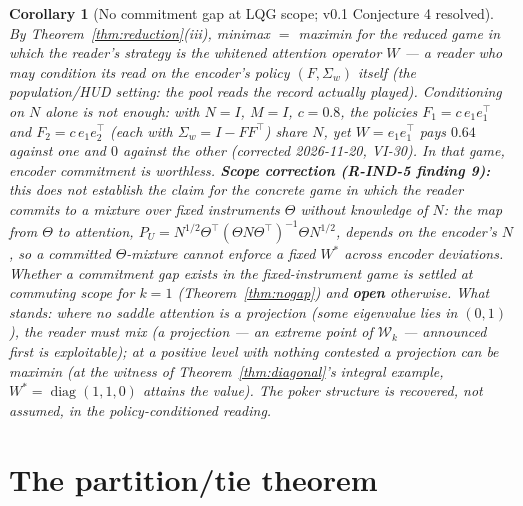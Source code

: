 \documentclass[11pt]{article}
\newtheorem{corollary}{Corollary}
\theoremstyle{definition}
\begin{document}
\begin{corollary}[No commitment gap at LQG scope; v0.1 Conjecture 4
resolved]\label{cor:commit}
By Theorem~\ref{thm:reduction}(iii), minimax $=$ maximin \emph{for
the reduced game in which the reader's strategy is the whitened
attention operator $W$} --- a reader who may condition its read on
the encoder's policy $(F,\Sigma_w)$ itself (the population/HUD
setting: the pool reads the record actually played). Conditioning on
$N$ alone is not enough: with $N=I$, $M=I$, $c=0.8$, the policies
$F_1=c\,e_1e_1^\top$ and $F_2=c\,e_1e_2^\top$ (each with
$\Sigma_w=I-FF^\top$) share $N$, yet $W=e_1e_1^\top$ pays $0.64$
against one and $0$ against the other (corrected 2026-11-20, VI-30).
In that game, encoder commitment is worthless. \textbf{Scope correction
(R-IND-5 finding 9):} this does \emph{not} establish the claim for
the concrete game in which the reader commits to a mixture over
fixed instruments $\Theta$ \emph{without} knowledge of $N$: the map
from $\Theta$ to attention, $P_U = N^{1/2}\Theta^\top(\Theta
N\Theta^\top)^{-1}\Theta N^{1/2}$, depends on the encoder's $N$, so
a committed $\Theta$-mixture cannot enforce a fixed $W^\ast$ across
encoder deviations. Whether a commitment gap exists in the
fixed-instrument game is settled at commuting scope for $k=1$
(Theorem~\ref{thm:nogap}) and \textbf{open} otherwise. What stands:
where no saddle attention is a projection (some eigenvalue lies in $(0,1)$), the reader must mix
(a projection --- an extreme point of $\mathcal W_k$ --- announced
first is exploitable); at a positive level with nothing contested a projection can be
maximin (at the witness of Theorem~\ref{thm:diagonal}'s integral
example, $W^\ast=\operatorname{diag}(1,1,0)$ attains the value). The
poker structure is recovered, not assumed, in the policy-conditioned
reading.
\end{corollary}

\section{The partition/tie theorem}
\end{document}
